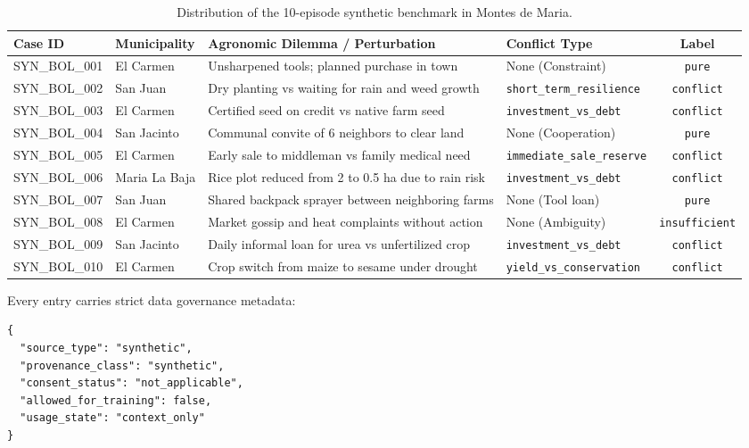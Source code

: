 \documentclass[11pt,a4paper]{article}
\begin{document}
\begin{table}[H]
\centering
\small
\begin{tabularx}{\textwidth}{llXlc}
\toprule
\textbf{Case ID} & \textbf{Municipality} & \textbf{Agronomic Dilemma / Perturbation} & \textbf{Conflict Type} & \textbf{Label} \\
\midrule
SYN\_BOL\_001 & El Carmen & Unsharpened tools; planned purchase in town & None (Constraint) & \texttt{pure} \\
SYN\_BOL\_002 & San Juan & Dry planting vs waiting for rain and weed growth & \texttt{short\_term\_resilience} & \texttt{conflict} \\
SYN\_BOL\_003 & El Carmen & Certified seed on credit vs native farm seed & \texttt{investment\_vs\_debt} & \texttt{conflict} \\
SYN\_BOL\_004 & San Jacinto & Communal convite of 6 neighbors to clear land & None (Cooperation) & \texttt{pure} \\
SYN\_BOL\_005 & El Carmen & Early sale to middleman vs family medical need & \texttt{immediate\_sale\_reserve} & \texttt{conflict} \\
SYN\_BOL\_006 & Maria La Baja & Rice plot reduced from 2 to 0.5 ha due to rain risk & \texttt{investment\_vs\_debt} & \texttt{conflict} \\
SYN\_BOL\_007 & San Juan & Shared backpack sprayer between neighboring farms & None (Tool loan) & \texttt{pure} \\
SYN\_BOL\_008 & El Carmen & Market gossip and heat complaints without action & None (Ambiguity) & \texttt{insufficient} \\
SYN\_BOL\_009 & San Jacinto & Daily informal loan for urea vs unfertilized crop & \texttt{investment\_vs\_debt} & \texttt{conflict} \\
SYN\_BOL\_010 & El Carmen & Crop switch from maize to sesame under drought & \texttt{yield\_vs\_conservation} & \texttt{conflict} \\
\bottomrule
\end{tabularx}
\caption{Distribution of the 10-episode synthetic benchmark in Montes de Maria.}
\label{tab:synthetic_cases_en}
\end{table}

Every entry carries strict data governance metadata:
\begin{lstlisting}
{
  "source_type": "synthetic",
  "provenance_class": "synthetic",
  "consent_status": "not_applicable",
  "allowed_for_training": false,
  "usage_state": "context_only"
}
\end{lstlisting}
\end{document}
